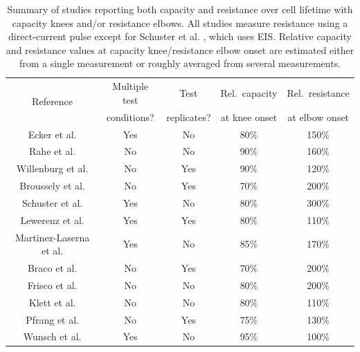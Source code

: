 \documentclass[journal=jpclcd,manuscript=article]{achemso}
\begin{document}
\begin{table}[!ht]
    \centering
    \begin{tabular}{||c||c|c|c|c||}
        \hline
\multirow{2}{*}{Reference}
& Multiple test & Test        & Rel.~capacity & Rel.~resistance \\
& conditions?   & replicates? & at knee onset & at elbow onset \\
        \hline
        Ecker et al.\cite{ecker_calendar_2014} & Yes & No & 80\% & 150\% \\
        Rahe et al.\cite{rahe_nanoscale_2019} & No & No & 90\% & 160\% \\
        Willenburg et al.\cite{willenberg_development_2020} & No & Yes & 90\% & 120\% \\
        Broussely et al.\cite{broussely_main_2005} & No & Yes & 70\% & 200\% \\
        Schuster et al.\cite{schuster_nonlinear_2015} & Yes & No & 80\% & 300\% \\
        Lewerenz et al.\cite{lewerenz_systematic_2017, lewerenz_post-mortem_2017} & Yes & Yes & 80\% & 110\% \\
        Martinez-Laserna et al.\cite{martinez-laserna_technical_2018} & Yes & No &  85\% & 170\% \\
        Braco et al.\cite{braco_experimental_2020} & No & Yes & 70\% & 200\% \\
        Frisco et al.\cite{frisco_understanding_2016} & No & No & 80\% & 200\% \\
        Klett et al.\cite{klett_non-uniform_2014} & No & No & 80\% & 110\% \\
        Pfrang et al.\cite{pfrang_long-term_2018} & No & Yes & 75\% & 130\% \\
        Wunsch et al.\cite{wunsch_investigation_2019} & Yes & No & 95\% & 100\% \\
        \hline
    \end{tabular}
    \caption{Summary of studies reporting both capacity and resistance over cell lifetime with capacity knees and/or resistance elbows. All studies measure resistance using a direct-current pulse except for Schuster et al. \cite{schuster_nonlinear_2015}, which uses EIS. Relative capacity and resistance values at capacity knee/resistance elbow onset are estimated either from a single measurement or roughly averaged from several measurements.}
    \label{tab:dcr_growth_papers}
\end{table}
\end{document}
